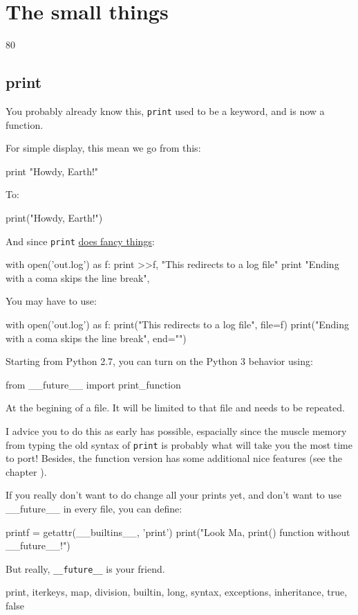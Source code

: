
\chapter{The small things}

80%

\section{print}

You probably already know this, \lstinline{print} used to be a keyword, and is now a function.

For simple display, this mean we go from this:

\begin{py}
print "Howdy, Earth!"
\end{py}

To:

\begin{py}
print("Howdy, Earth!")
\end{py}

And since \lstinline{print} \href{https://www.python.org/dev/peps/pep-0214/}{does fancy things}:

\begin{py}
with open('out.log') as f:
    print >>f, "This redirects to a log file"
print "Ending with a coma skips the line break",
\end{py}

You may have to use:

\begin{py}
with open('out.log') as f:
    print("This redirects to a log file", file=f)
print("Ending with a coma skips the line break", end="")
\end{py}

Starting from Python 2.7, you can turn on the Python 3 behavior using:

\begin{py}
from __future__ import print_function
\end{py}

At the begining of a file. It will be limited to that file and needs to be repeated.

I advice you to do this as early has possible, espacially since the muscle memory from typing the old syntax of \lstinline{print} is probably what will take you the most time to port! Besides, the function version has some additional nice features (see the chapter ).

If you really don't want to do change all your prints yet, and don't want to use __future__ in every file, you can define:

\begin{py}
printf = getattr(__builtins__, 'print')
print("Look Ma, print() function without __future__!")
\end{py}

But really, \lstinline{__future__} is your friend.

print, iterkeys, map, division, builtin, long, syntax,  exceptions, inheritance, true, false
